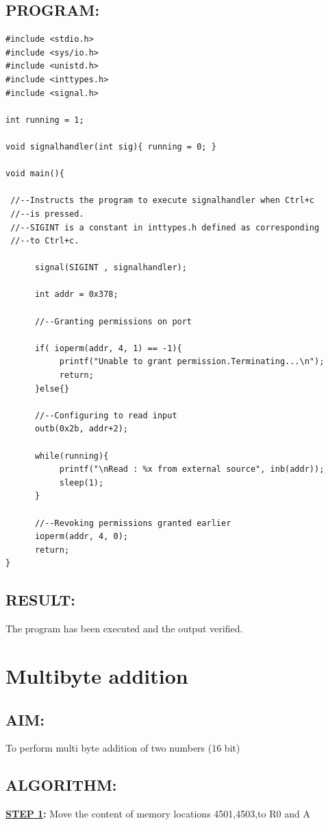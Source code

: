 \documentclass[a4paper,28pt]{report}
\begin{document}
\section*{PROGRAM:}
\begin{lstlisting}
#include <stdio.h>
#include <sys/io.h>
#include <unistd.h>
#include <inttypes.h>
#include <signal.h>

int running = 1;

void signalhandler(int sig){ running = 0; }

void main(){

 //--Instructs the program to execute signalhandler when Ctrl+c
 //--is pressed.
 //--SIGINT is a constant in inttypes.h defined as corresponding
 //--to Ctrl+c.
 
      signal(SIGINT , signalhandler);
      
      int addr = 0x378;
      
      //--Granting permissions on port
      
      if( ioperm(addr, 4, 1) == -1){
           printf("Unable to grant permission.Terminating...\n");
           return;
      }else{}
      
      //--Configuring to read input
      outb(0x2b, addr+2);
      
      while(running){
           printf("\nRead : %x from external source", inb(addr));
           sleep(1);
      }
      
      //--Revoking permissions granted earlier
      ioperm(addr, 4, 0);
      return;
}
\end{lstlisting}

\section*{RESULT:}
The program has been executed and the output verified.
%
%
\newpage
\chapter{Multibyte addition}
%
%
\section*{AIM:}
	To perform multi byte addition of two numbers (16 bit)
	
\section*{ALGORITHM:}
\textbf{\underline{STEP 1}:} Move the content of memory locations 4501,4503,to R0 and A
\end{document}
